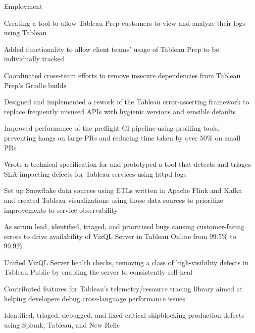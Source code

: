 \documentclass{cv}
\begin{document}

\begin{cvsection}{Employment}
  {
    \item Creating a tool to allow Tableau Prep customers to view and analyze their logs using Tableau
    \item Added functionality to allow client teams' usage of Tableau Prep to be individually tracked
    \item Coordinated cross-team efforts to remove insecure dependencies from Tableau Prep's Gradle builds
    \item Designed and implemented a rework of the Tableau error-asserting framework to replace frequently misused APIs with hygienic versions and sensible defaults
    \item Improved performance of the preflight CI pipeline using profiling tools, preventing hangs on large PRs and reducing time taken by over 50\% on small PRs
    \item Wrote a technical specification for and prototyped a tool that detects and triages SLA-impacting defects for Tableau services using httpd logs
    \item Set up Snowflake data sources using ETLs written in Apache Flink and Kafka and created Tableau visualizations using those data sources to prioritize improvements to service observability
    \item As scrum lead, identified, triaged, and prioritized bugs causing customer-facing errors to drive availability of VizQL Server in Tableau Online from 99.5\% to 99.9\%
    \item Unified VizQL Server health checks, removing a class of high-visibility defects in Tableau Public by enabling the server to consistently self-heal
    \item Contributed features for Tableau's telemetry/resource tracing library aimed at helping developers debug cross-language performance issues
    \item Identified, triaged, debugged, and fixed critical shipblocking production defects using Splunk, Tableau, and New Relic
}
\end{cvsection}
\end{document}
